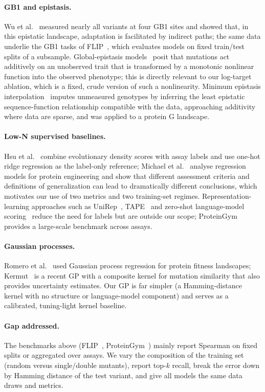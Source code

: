 \paragraph{GB1 and epistasis.}
Wu et al.~\cite{wu2016adaptation} measured nearly all variants at four GB1 sites and showed that, in this epistatic landscape, adaptation is facilitated by indirect paths; the same data underlie the GB1 tasks of FLIP~\cite{dallago2021flip}, which evaluates models on fixed train/test splits of a subsample.
Global-epistasis models~\cite{otwinowski2018inferring} posit that mutations act additively on an unobserved trait that is transformed by a monotonic nonlinear function into the observed phenotype; this is directly relevant to our log-target ablation, which is a fixed, crude version of such a nonlinearity.
Minimum epistasis interpolation~\cite{zhou2020minimum} imputes unmeasured genotypes by inferring the least epistatic sequence-function relationship compatible with the data, approaching additivity where data are sparse, and was applied to a protein G landscape.

\paragraph{Low-N supervised baselines.}
Hsu et al.~\cite{hsu2022learning} combine evolutionary density scores with assay labels and use one-hot ridge regression as the label-only reference; Michael et al.~\cite{michael2024systematic} analyse regression models for protein engineering and show that different assessment criteria and definitions of generalization can lead to dramatically different conclusions, which motivates our use of two metrics and two training-set regimes.
Representation-learning approaches such as UniRep~\cite{alley2019unified}, TAPE~\cite{rao2019evaluating} and zero-shot language-model scoring~\cite{meier2021language} reduce the need for labels but are outside our scope; ProteinGym~\cite{notin2023proteingym} provides a large-scale benchmark across assays.

\paragraph{Gaussian processes.}
Romero et al.~\cite{romero2013navigating} used Gaussian process regression for protein fitness landscapes; Kermut~\cite{groth2024kermut} is a recent GP with a composite kernel for mutation similarity that also provides uncertainty estimates.
Our GP is far simpler (a Hamming-distance kernel with no structure or language-model component) and serves as a calibrated, tuning-light kernel baseline.

\paragraph{Gap addressed.}
The benchmarks above (FLIP~\cite{dallago2021flip}, ProteinGym~\cite{notin2023proteingym}) mainly report Spearman on fixed splits or aggregated over assays. We vary the composition of the training set (random versus single/double mutants), report top-$k$ recall, break the error down by Hamming distance of the test variant, and give all models the same data draws and metrics.
